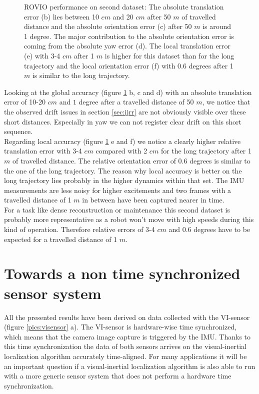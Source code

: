 \begin{figure}[h]
\begin{subfigure}[b]{0.45\textwidth}
    \caption{}
  \end{subfigure}
   \caption{ROVIO performance on second dataset: The absolute translation error (b) lies between 10 $cm$ and 20 $cm$ after 50 $m$ of travelled distance and the absolute orientation error (c) after 50 $m$ is around 1 degree. The major contribution to the absolute orientation error is coming from the absolute yaw error (d). The local translation error (e) with 3-4 $cm$ after 1 $m$ is higher for this dataset than for the long trajectory and the local orientation error (f) with 0.6 degrees after 1 $m$ is similar to the long trajectory.}
   \label{pics:euroc}
\end{figure}

Looking at the global accuracy (figure \ref{pics:euroc} b, c and d) with an absolute translation error of 10-20 $cm$ and $1$ degree after a travelled distance of 50 $m$, we notice that the observed drift issues in section \ref{sec:ijrr} are not obviously visible over these short distances. Especially in yaw we can not register clear drift on this short sequence. \\

Regarding local accuracy (figure \ref{pics:euroc} e and f) we notice a clearly higher relative translation error with 3-4 $cm$ compared with 2 $cm$ for the long trajectory after 1 $m$ of travelled distance. The relative orientation error of 0.6 degrees is similar to the one of the long trajectory. The reason why local accuracy is better on the long trajectory lies probably in the higher dynamics within that set. The IMU measurements are less noisy for higher excitements and two frames with a travelled distance of 1 $m$ in between have been captured nearer in time. \\

For a task like dense reconstruction or maintenance this second dataset is probably more representative as a robot won't move with high speeds during this kind of operation. Therefore relative errors of 3-4 $cm$ and 0.6 degrees have to be expected for a travelled distance of 1 $m$.

\section{Towards a non time synchronized sensor system}
\label{sec:timesync}

All the presented results have been derived on data collected with the VI-sensor (figure \ref{pics:visensor} a). The VI-sensor is hardware-wise time synchronized, which means that the camera image capture is triggered by the IMU. Thanks to this time synchronization the data of both sensors arrives on the visual-inertial localization algorithm accurately time-aligned. For many applications it will be an important question if a visual-inertial localization algorithm is also able to run with a more generic sensor system that does not perform a hardware time synchronization. \\

